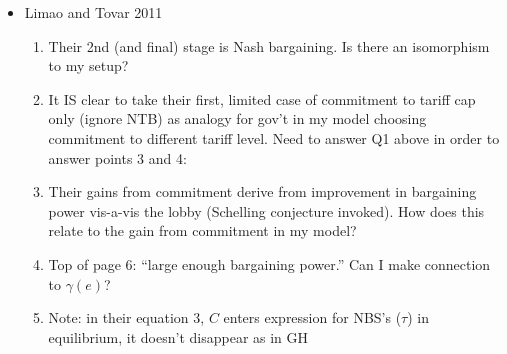 \documentclass[12pt]{article}
\newcommand{\ga}{\gamma}
\begin{document}
\begin{itemize}
\begin{itemize}
		\end{itemize}
	\item Limao and Tovar 2011
		\begin{enumerate}
			\item Their 2nd (and final) stage is Nash bargaining. Is there an isomorphism to my setup?
			\item It IS clear to take their first, limited case of commitment to tariff cap only (ignore NTB) as analogy for gov't in my model choosing commitment to different tariff level. Need to answer Q1 above in order to answer points 3 and 4:
			\item Their gains from commitment derive from improvement in bargaining power vis-a-vis the lobby (Schelling conjecture invoked). How does this relate to the gain from commitment in my model?
			\item Top of page 6: ``large enough bargaining power.'' Can I make connection to $\ga(e)$?
			\item Note: in their equation 3, $C$ enters expression for NBS's ($\tau$) in equilibrium, it doesn't disappear as in GH
		\end{enumerate}
\end{itemize}
\end{document}
